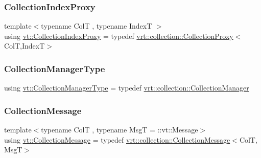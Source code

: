 \mbox{\label{namespacevt_a2be17f5dafb626fe9f58d762b6aad2f0}} 
\subsubsection{\texorpdfstring{Collection\+Index\+Proxy}{CollectionIndexProxy}}
{\footnotesize\ttfamily template$<$typename ColT , typename IndexT $>$ \\
using \hyperlink{namespacevt_a2be17f5dafb626fe9f58d762b6aad2f0}{vt\+::\+Collection\+Index\+Proxy} = typedef \hyperlink{structvt_1_1vrt_1_1collection_1_1_collection_proxy}{vrt\+::collection\+::\+Collection\+Proxy}$<$ColT,IndexT$>$}

\mbox{\label{namespacevt_a290f7e8941f9f411b54cdb15b6cea107}} 
\subsubsection{\texorpdfstring{Collection\+Manager\+Type}{CollectionManagerType}}
{\footnotesize\ttfamily using \hyperlink{namespacevt_a290f7e8941f9f411b54cdb15b6cea107}{vt\+::\+Collection\+Manager\+Type} = typedef \hyperlink{structvt_1_1vrt_1_1collection_1_1_collection_manager}{vrt\+::collection\+::\+Collection\+Manager}}

\mbox{\label{namespacevt_ae7700e12f79c0fec16964aab84838428}} 
\subsubsection{\texorpdfstring{Collection\+Message}{CollectionMessage}}
{\footnotesize\ttfamily template$<$typename ColT , typename MsgT  = \+::vt\+::\+Message$>$ \\
using \hyperlink{namespacevt_ae7700e12f79c0fec16964aab84838428}{vt\+::\+Collection\+Message} = typedef \hyperlink{structvt_1_1vrt_1_1collection_1_1_collection_message}{vrt\+::collection\+::\+Collection\+Message}$<$ColT, MsgT$>$}

\mbox{\label{namespacevt_a0d58a693bfb96e0ce5d145692a1a1f98}} 
